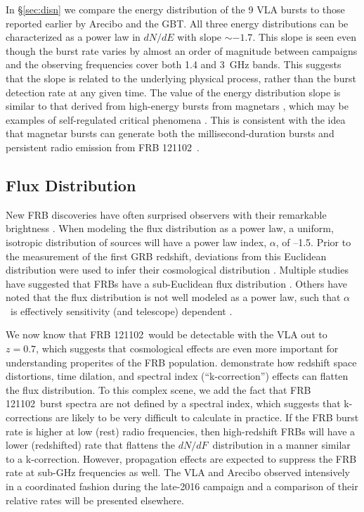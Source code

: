 \documentclass[twocolumn]{aastex61}
\newcommand{\frb}{FRB 121102}
\begin{document}
In \S \ref{sec:disn} we compare the energy distribution of the 9 VLA bursts to those reported earlier by Arecibo and the GBT. All three energy distributions can be characterized as a power law in $dN/dE$ with slope $\sim-1.7$. This slope is seen even though the burst rate varies by almost an order of magnitude between campaigns and the observing frequencies cover both 1.4 and 3~GHz bands. This suggests that the slope is related to the underlying physical process, rather than the burst detection rate at any given time. The value of the energy distribution slope is similar to that derived from high-energy bursts from magnetars \citep{2000ApJ...532L.121G, 2011ApJ...739...94S}, which may be examples of self-regulated critical phenomena \citep[slope$=-5/3$;][]{2011SoPh..274...99A}. This is consistent with the idea that magnetar bursts can generate both the millisecond-duration bursts and persistent radio emission from \frb\ \citep{2017arXiv170208644B}.

\subsection{Flux Distribution}

New FRB discoveries have often surprised observers with their remarkable brightness \citep{2007Sci...318..777L, 2016arXiv161105758R}. When modeling the flux distribution as a power law, a uniform, isotropic distribution of sources will have a power law index, $\alpha$, of --1.5. Prior to the measurement of the first GRB redshift, deviations from this Euclidean distribution were used to infer their cosmological distribution \citep[e.g., the $V/V_{\rm{max}}$\ test;][]{1992ApJ...388L..45M, 1995ApJ...453...25F}. Multiple studies have suggested that FRBs have a sub-Euclidean flux distribution \citep[$-0.5<\alpha<-0.9$;][]{2016ApJ...830...75V, 2016arXiv160206099L, 2016arXiv161100458L}. Others have noted that the flux distribution is not well modeled as a power law, such that $\alpha$\ is effectively sensitivity (and telescope) dependent \citep{2016MNRAS.461..984O, 2017arXiv170208040C}.

We now know that \frb\ would be detectable with the VLA out to $z=0.7$, which suggests that cosmological effects are even more important for understanding properites of the FRB population. \citet{2017arXiv170208040C} demonstrate how redshift space distortions, time dilation, and spectral index (``k-correction'') effects can flatten the flux distribution. To this complex scene, we add the fact that \frb\ burst spectra are not defined by a spectral index, which suggests that k-corrections are likely to be very difficult to calculate in practice. If the FRB burst rate is higher at low (rest) radio frequencies, then high-redshift FRBs will have a lower (redshifted) rate that flattens the $dN/dF$\ distribution in a manner similar to a k-correction. However, propagation effects are expected to suppress the FRB rate at sub-GHz frequencies \citep{2017MNRAS.465.2286R, 2017arXiv170107457C} as well. The VLA and Arecibo observed intensively in a coordinated fashion during the late-2016 campaign and a comparison of their relative rates will be presented elsewhere. 
\end{document}

